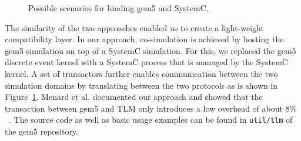 \begin{figure}
    \centering
    \caption{Possible scenarios for binding gem5 and SystemC.}
    \label{fig:gem5_tlm_example}
\end{figure}

The similarity of the two approaches enabled us to create a light-weight
compatibility layer. In our approach, co-simulation is achieved by hosting the
gem5 simulation on top of a SystemC simulation. For this, we replaced the gem5
discrete event kernel with a SystemC process that is managed by the SystemC
kernel. A set of transactors further enables communication between the two
simulation domains by translating between the two protocols as is shown in
Figure~\ref{fig:gem5_tlm_example}. Menard et al. documented our approach and showed
that the transaction between gem5 and TLM only introduces a low overhead of
about \(8\%\)~\cite{menard2017-system-systemc}.
The source code as well as basic usage examples can be found in
\texttt{util/tlm} of the gem5 repository.

